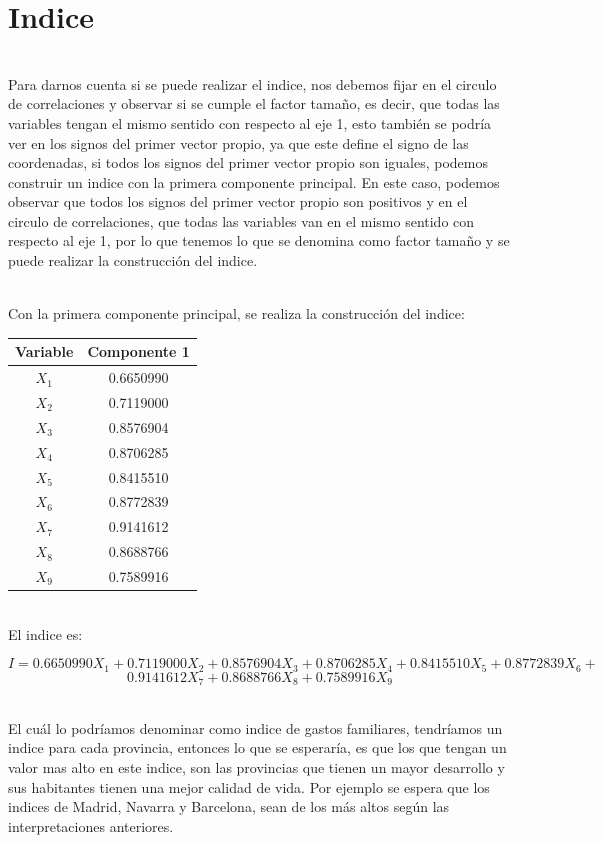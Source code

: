 \documentclass[report,oneside]{revcoles}
\begin{document}
\section{Indice}
~\\Para darnos cuenta si se puede realizar el indice, nos debemos fijar en el circulo de correlaciones y observar si se cumple el factor tamaño, es decir, que todas las variables tengan el mismo sentido con respecto al eje 1, esto también se podría ver en los signos del primer vector propio, ya que este define el signo de las coordenadas, si todos los signos del primer vector propio son iguales, podemos construir un indice con la primera componente principal. En este caso, podemos observar que todos los signos del primer vector propio son positivos y en el circulo de correlaciones, que todas las variables van en el mismo sentido con respecto al eje 1, por lo que tenemos lo que se denomina como factor tamaño y se puede realizar la construcción del indice.

~\\Con la primera componente principal, se realiza la construcción del indice:

\begin{center}
\begin{tabular}{|c|c|}
\hline 
Variable & Componente 1 \\ 
\hline 
$X_1$ & 0.6650990 \\ 
$X_2$ & 0.7119000 \\  
$X_3$ & 0.8576904 \\ 
$X_4$ & 0.8706285 \\ 
$X_5$ & 0.8415510 \\ 
$X_6$ & 0.8772839 \\ 
$X_7$ & 0.9141612 \\  
$X_8$ & 0.8688766 \\ 
$X_9$ & 0.7589916 \\ 
\hline 
\end{tabular} 
\end{center}

~\\El indice es:

$$I=0.6650990 X_1 +0.7119000 X_2 + 0.8576904 X_3 + 0.8706285 X_4 + 0.8415510 X_5+ 0.8772839 X_6 +$$
$$0.9141612 X_7 + 0.8688766 X_8 + 0.7589916 X_9$$

~\\El cuál lo podríamos denominar como indice de gastos familiares, tendríamos un indice para cada provincia, entonces lo que se esperaría, es que los que tengan un valor mas alto en este indice, son las provincias  que tienen un mayor desarrollo y sus habitantes tienen una mejor calidad de vida. Por ejemplo se espera que los indices de Madrid, Navarra y Barcelona, sean de los más altos según las interpretaciones anteriores.
\end{document}
